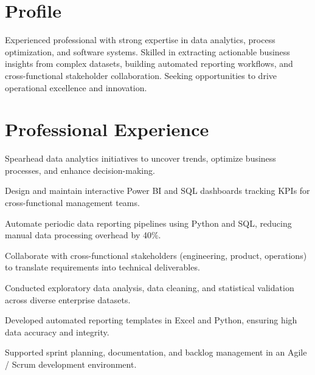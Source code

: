 \documentclass[10pt,a4paper]{article}
\begin{document}

\section*{Profile}
Experienced professional with strong expertise in data analytics, process optimization, and software systems. Skilled in extracting actionable business insights from complex datasets, building automated reporting workflows, and cross-functional stakeholder collaboration. Seeking opportunities to drive operational excellence and innovation.

\section*{Professional Experience}

\begin{cvitems}

  \item Spearhead data analytics initiatives to uncover trends, optimize business processes, and enhance decision-making.

  \item Design and maintain interactive Power BI and SQL dashboards tracking KPIs for cross-functional management teams.

  \item Automate periodic data reporting pipelines using Python and SQL, reducing manual data processing overhead by 40\%.

  \item Collaborate with cross-functional stakeholders (engineering, product, operations) to translate requirements into technical deliverables.

\end{cvitems}
\vspace{2pt}

\begin{cvitems}

  \item Conducted exploratory data analysis, data cleaning, and statistical validation across diverse enterprise datasets.

  \item Developed automated reporting templates in Excel and Python, ensuring high data accuracy and integrity.

  \item Supported sprint planning, documentation, and backlog management in an Agile / Scrum development environment.

\end{cvitems}
\vspace{2pt}
\end{document}
